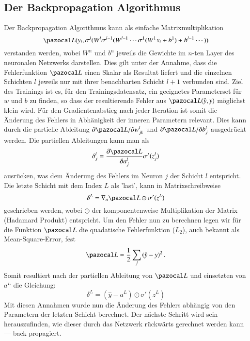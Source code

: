 \subsection{Der Backpropagation Algorithmus}
Der Backpropagation Algorithmus kann als einfache Matrixmultiplikation
\begin{equation}
\Lb(y_{i}, \sigma^{l}(W^{l}\sigma^{l-1}(W^{l-1}\cdots \sigma^{1}(W^{1}x_i+b^{1}) + b^{l-1} \cdots ) )
\end{equation}
verstanden werden, wobei $W^{n}$ und $b^{n}$ jeweils die Gewichte im $n$-ten Layer des neuronalen Netzwerks darstellen. Dies gilt unter der Annahme, dass die Fehlerfunktion $\Lb$ einen Skalar als Resultat liefert und die einzelnen Schichten $l$ jeweils nur mit ihrer benachbarten Schicht $l+1$ verbunden sind. Ziel des Trainings ist es, für den Trainingsdatensatz, ein geeignetes Parameterset für $w$ und $b$ zu finden, so dass der resultierende Fehler aus $\Lb(\hat{y}, y)$ möglichst klein wird. Für den Gradientenabstieg nach jeder Iteration ist somit die Änderung des Fehlers in Abhänigkeit der inneren Parametern relevant. Dies kann durch die partielle Ableitung $\partial \Lb / \partial w^l_{jk}$ und $\partial \Lb / \partial b^l_j$ ausgedrückt werden. Die partiellen Ableitungen kann man als 
\begin{equation}
\delta^{l}_{j} = \frac{\partial \Lb}{\partial a^{l}_{j}} \sigma'(z^l_j)
\end{equation}
ausrücken, was dem Änderung des Fehlers im Neuron $j$ der Schicht $l$ entspricht. Die letzte Schicht mit dem Index $L$ als 'last', kann in Matrixschreibweise
\begin{equation}
\delta^{L} = \nabla_a \Lb \odot \sigma'(z^L)
\end{equation}
geschrieben werden, wobei $\odot$ der komponentenweise Multiplikation der Matrix (Hadamard Produkt) entspricht. Um den Fehler nun zu berechnen legen wir für die Funktion $\Lb$ die quadatische Fehlerfunktion ($L_2$), auch bekannt als Mean-Square-Error, fest
\begin{equation}
\Lb = \frac{1}{2} \sum_j \left( \hat{y} - y \right)^2 \text{.}
\end{equation}
Somit resultiert nach der partiellen Ableitung von $\Lb$ und einsetzten von $a^L$ die Gleichung:
\begin{equation}
\delta^{L} = (\hat{y} - a^L) \odot \sigma'(z^L)
\end{equation}
Mit diesen Annahmen wurde nun die Änderung des Fehlers abhängig von den Parametern der letzten Schicht berechnet. Der nächste Schritt wird sein herauszufinden, wie dieser durch das Netzwerk rückwärts gerechnet werden kann --- back propagiert.
